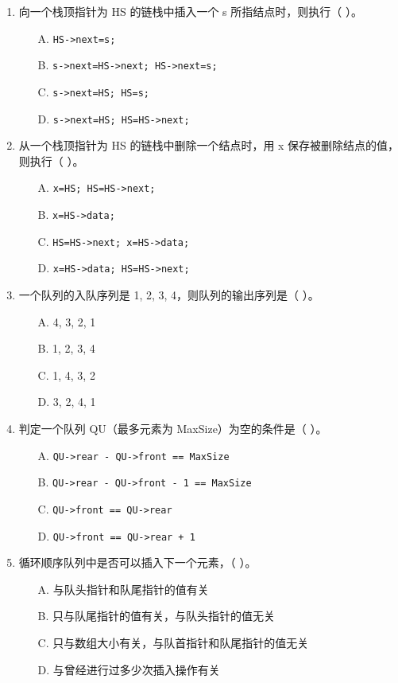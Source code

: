 \documentclass[12pt, a4paper]{article}
\begin{document}
\begin{enumerate}
    \item 向一个栈顶指针为 HS 的链栈中插入一个 s 所指结点时，则执行（ ）。
    \begin{enumerate}
        \item[A.] \texttt{HS->next=s;}
        \item[B.] \texttt{s->next=HS->next; HS->next=s;}
        \item[C.] \texttt{s->next=HS; HS=s;}
        \item[D.] \texttt{s->next=HS; HS=HS->next;}
    \end{enumerate}
    
    \item 从一个栈顶指针为 HS 的链栈中删除一个结点时，用 x 保存被删除结点的值，则执行（ ）。
    \begin{enumerate}
        \item[A.] \texttt{x=HS; HS=HS->next;}
        \item[B.] \texttt{x=HS->data;}
        \item[C.] \texttt{HS=HS->next; x=HS->data;}
        \item[D.] \texttt{x=HS->data; HS=HS->next;}
    \end{enumerate}
    
    \item 一个队列的入队序列是 1, 2, 3, 4，则队列的输出序列是（ ）。
    \begin{enumerate}
        \item[A.] 4, 3, 2, 1
        \item[B.] 1, 2, 3, 4
        \item[C.] 1, 4, 3, 2
        \item[D.] 3, 2, 4, 1
    \end{enumerate}
    
    \item 判定一个队列 QU（最多元素为 MaxSize）为空的条件是（ ）。
    \begin{enumerate}
        \item[A.] \texttt{QU->rear - QU->front == MaxSize}
        \item[B.] \texttt{QU->rear - QU->front - 1 == MaxSize}
        \item[C.] \texttt{QU->front == QU->rear}
        \item[D.] \texttt{QU->front == QU->rear + 1}
    \end{enumerate}
    
    \item 循环顺序队列中是否可以插入下一个元素，（ ）。
    \begin{enumerate}
        \item[A.] 与队头指针和队尾指针的值有关
        \item[B.] 只与队尾指针的值有关，与队头指针的值无关
        \item[C.] 只与数组大小有关，与队首指针和队尾指针的值无关
        \item[D.] 与曾经进行过多少次插入操作有关
    \end{enumerate}
    

\end{enumerate}
\end{document}
